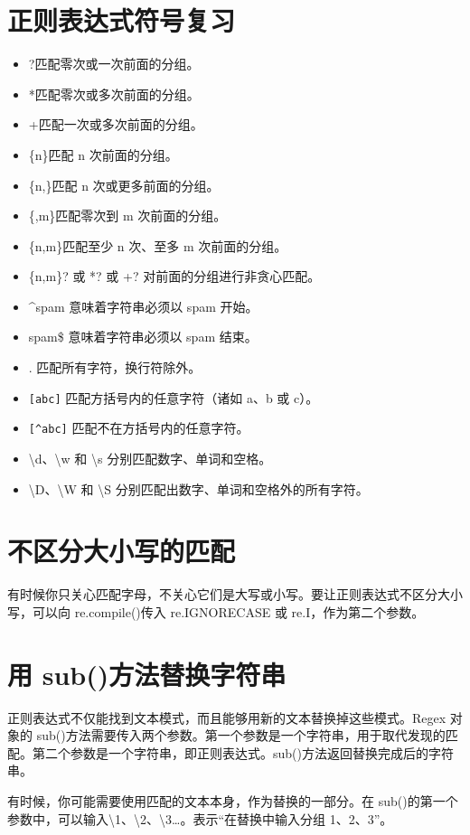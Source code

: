 \section{正则表达式符号复习}
\begin{itemize}
    \item ?匹配零次或一次前面的分组。
    \item  *匹配零次或多次前面的分组。
    \item  +匹配一次或多次前面的分组。
    \item  \{n\}匹配 n 次前面的分组。
    \item  \{n,\}匹配 n 次或更多前面的分组。
    \item  \{,m\}匹配零次到 m 次前面的分组。
    \item  \{n,m\}匹配至少 n 次、至多 m 次前面的分组。
    \item  \{n,m\}? 或 *? 或 +? 对前面的分组进行非贪心匹配。
    \item  \^{}spam 意味着字符串必须以 spam 开始。
    \item  spam\$ 意味着字符串必须以 spam 结束。
    \item  . 匹配所有字符，换行符除外。
    \item \lstinline![abc]! 匹配方括号内的任意字符（诸如 a、b 或 c）。
    \item  \lstinline![^abc]! 匹配不在方括号内的任意字符。
    \item  \textbackslash d、\textbackslash w 和 \textbackslash s 分别匹配数字、单词和空格。
    \item  \textbackslash D、\textbackslash W 和 \textbackslash S 分别匹配出数字、单词和空格外的所有字符。
\end{itemize}
\section{不区分大小写的匹配}
有时候你只关心匹配字母，不关心它们是大写或小写。要让正则表达式不区分大小写，可以向 re.compile()传入 re.IGNORECASE 或 re.I，作为第二个参数。

\section{用 sub()方法替换字符串}
正则表达式不仅能找到文本模式，而且能够用新的文本替换掉这些模式。Regex 对象的 sub()方法需要传入两个参数。第一个参数是一个字符串，用于取代发现的匹配。第二个参数是一个字符串，即正则表达式。sub()方法返回替换完成后的字符串。

有时候，你可能需要使用匹配的文本本身，作为替换的一部分。在 sub()的第一个参数中，可以输入\textbackslash 1、\textbackslash 2、\textbackslash 3\dots。表示“在替换中输入分组 1、2、3”。

